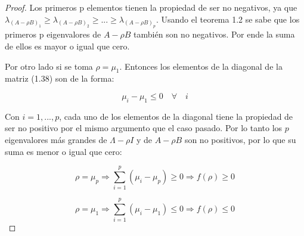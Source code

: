 \begin{proof}
Los primeros p elementos tienen la propiedad de ser no negativos, ya que $\lambda_{(A-\rho B)_1} \geq \lambda_{(A-\rho B)_2} \geq ... \geq \lambda_{(A-\rho B)_p}$. Usando el teorema 1.2 se sabe que los primeros p eigenvalores de $A-\rho B$ también son no negativos. Por ende la suma de ellos es mayor o igual que cero. 

Por otro lado si se toma $\rho = \mu_1$. Entonces los elementos de la diagonal de la matriz (1.38) son de la forma:

\begin{equation}\label{eq:2.41}
   \mu_i - \mu_1  \leq 0 \quad \forall \quad i
\end{equation} 

Con $i = 1, ..., p$, cada uno de los elementos de la diagonal tiene la propiedad de ser no positivo por el mismo argumento que el caso pasado. Por lo tanto los $p$ eigenvalores más grandes de $\Lambda - \rho I$ y de $A-\rho B$ son no positivos, por lo que su suma es menor o igual que cero:

\begin{equation}\label{eq:2.42}
  \rho = \mu_p  \Rightarrow \sum_{i=1}^{p} (\mu_i- \mu_p) \geq 0 \Rightarrow f(\rho) \geq 0
\end{equation}

\begin{equation}\label{eq:2.43}
  \rho = \mu_1  \Rightarrow \sum_{i=1}^{p} (\mu_i - \mu_1) \leq 0 \Rightarrow f(\rho) \leq 0
\end{equation}

\end{proof}

\pagebreak

